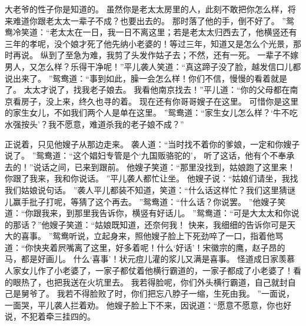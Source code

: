 大老爷的性子你是知道的。
虽然你是老太太房里的人，此刻不敢把你怎么样，将来难道你跟老太太一辈子不成？也要出去的。
那时落了他的手，倒不好了。
”鸳鸯冷笑道：“老太太在一日，我一日不离这里；若是老太太归西去了，他横竖还有三年的孝呢，没个娘才死了他先纳小老婆的！等过三年，知道又是怎么个光景，那时再说。
纵到了至急为难，我剪了头发作姑子去；不然，还有一死。
一辈子不嫁男人，又怎么样？乐得干净呢！”平儿袭人笑道：“真这蹄子没了脸，越发信口儿都说出来了。
”鸳鸯道：“事到如此，臊一会怎么样！你们不信，慢慢的看着就是了。
太太才说了，找我老子娘去。
我看他南京找去！”平儿道：“你的父母都在南京看房子，没上来，终久也寻的着。
现在还有你哥哥嫂子在这里。
可惜你是这里的家生女儿，不如我们两个人是单在这里。
”鸳鸯道：“家生女儿怎么样？‘牛不吃水强按头’？我不愿意，难道杀我的老子娘不成？”\par
正说着，只见他嫂子从那边走来。
袭人道：“当时找不着你的爹娘，一定和你嫂子说了。
”鸳鸯道：“这个娼妇专管是个‘九国贩骆驼的’，
听了这话，他有个不奉承去的！”说话之间，已来到跟前。
他嫂子笑道：“那里没找到，姑娘跑了这里来！你跟了我来，我和你说话。
”平儿袭人都忙让坐。
他嫂子说：“姑娘们请坐，我找我们姑娘说句话。
”袭人平儿都装不知道，笑道：“什么话这样忙？我们这里猜谜儿赢手批子打呢，等猜了这个再去。
”鸳鸯道：“什么话？你说罢。
”他嫂子笑道：“你跟我来，到那里我告诉你，横竖有好话儿。
”鸳鸯道：“可是大太太和你说的那话？”他嫂子笑道：“姑娘既知道，还奈何我！
快来，我细细的告诉你可是天大的喜事。
”鸳鸯听说，立起身来，照他嫂子脸上下死劲啐了一口，指着他骂道：“你快夹着屄嘴离了这里，好多着呢！什么‘好话’！宋徽宗的鹰，赵子昂的马，都是好画儿。
什么‘喜事’！状元痘儿灌的浆儿又满是喜事。
怪道成日家羡慕人家女儿作了小老婆了，一家子都仗着他横行霸道的，一家子都成了小老婆了！看的眼热了，也把我送在火坑里去。
我若得脸呢，你们外头横行霸道，自己就封自己是舅爷了。
我若不得脸败了时，你们把忘八脖子一缩，生死由我。
”一面说，一面哭，平儿袭人拦着劝。
他嫂子脸上下不来，因说道：“愿意不愿意，你也好说，不犯着牵三挂四的。
